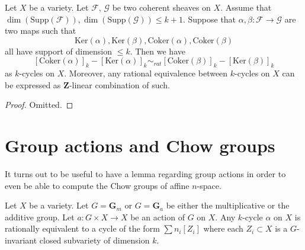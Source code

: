 \begin{lemma}
\label{lemma-maps-between-coherent-sheaves}
Let $X$ be a variety.
Let $\mathcal{F}$, $\mathcal{G}$ be two coherent sheaves on $X$.
Assume that
$\dim(\text{Supp}(\mathcal{F})), \dim(\text{Supp}(\mathcal{G})) \leq k + 1$.
Suppose that $\alpha, \beta : \mathcal{F} \to \mathcal{G}$
are two maps such that
$$
\text{Ker}(\alpha),
\text{Ker}(\beta),
\text{Coker}(\alpha),
\text{Coker}(\beta)
$$
all have support of dimension $\leq k$.
Then we have
$$
[\text{Coker}(\alpha)]_k - [\text{Ker}(\alpha)]_k
\sim_{rat}
[\text{Coker}(\beta)]_k - [\text{Ker}(\beta)]_k
$$
as $k$-cycles on $X$. Moreover, any rational equivalence between $k$-cycles on
$X$ can be expressed as $\mathbf{Z}$-linear combination of such.
\end{lemma}

\begin{proof}
Omitted.
\end{proof}



\section{Group actions and Chow groups}
\label{section-group-actions}

\noindent
It turns out to be useful to have a lemma regarding group actions
in order to even be able to compute the Chow groups of affine $n$-space.

\begin{lemma}
\label{lemma-Ga-Gm}
Let $X$ be a variety.
Let $G = \mathbf{G}_m$ or $G = \mathbf{G}_a$ be either the multiplicative
or the additive group.
Let $a : G \times X \to X$ be an action of $G$ on $X$.
Any $k$-cycle $\alpha$ on $X$ is rationally equivalent to a
cycle of the form $\sum n_i[Z_i]$ where each $Z_i \subset X$
is a $G$-invariant closed subvariety of dimension $k$.
\end{lemma}

